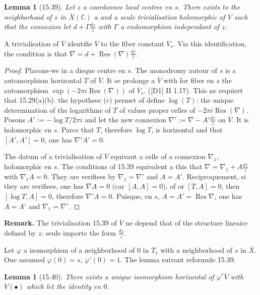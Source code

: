 \documentclass[12pt,a4paper]{article}
\theoremstyle{plain}
\newtheorem{lemma}[theorem]{Lemma}
\theoremstyle{definition}
\theoremstyle{remark}
\DeclareMathOperator{\Res}{Res}
\newcommand{\bC}{\mathbb{C}}
\begin{document}
\begin{lemma}[15.39]
Let $z$ a coordonnee local centree en $s$. There exists to the neighborhood of $s$ in $\overline{X}(\bC)$ a and a seule trivialisation holomorphic of $\overline{V}$ such that the connexion let $d + \Gamma \frac{dz}{z}$ with $\Gamma$ a endomorphism independant of $z$.
\end{lemma}

A trivialisation of $\overline{V}$ identifie $\overline{V}$ to the fiber constant $\overline{V}_s$. Via this identification, the condition is that $\nabla = d + \Res(\nabla) \frac{dz}{z}$.

\begin{proof}
Placons-we in a disque centre en $s$. The monodromy autour of $s$ is a automorphism horizontal $T$ of $\overline{V}$. It se prolonge a $\overline{V}$ with for fiber en $s$ the automorphism $\exp(-2\pi i \Res(\nabla))$ of $\overline{V}_s$. ([D1] II 1.17). This ne requiert that 15.29(a)(b). the hypothese (c) permet of define $\log(T)$: the unique determination of the logarithme of $T$ of values proper celles of $-2\pi i \Res(\nabla)$. Posons $A' := -\log T/2\pi i$ and let the new connexion $\nabla' := \nabla - A' \frac{dz}{z}$ on $\overline{V}$. It is holomorphic en $s$. Parce that $T$, therefore $\log T$, is horizontal and that $[A', A'] = 0$, one has $\nabla' A' = 0$.

The datum of a trivialisation of $\overline{V}$ equivaut a celle of a connexion $\nabla_1$, holomorphic en $s$. The conditions of 15.39 equivalent a this that $\nabla = \nabla_1 + A \frac{dz}{z}$ with $\nabla_1 A = 0$. They are verifiees by $\nabla_1 = \nabla'$ and $A = A'$. Reciproquement, si they are verifiees, one has $\nabla A = 0$ (car $[A,A] = 0$), of or $[T, A] = 0$, then $[\log T, A] = 0$, therefore $\nabla' A = 0$. Puisque, en $s$, $A = A' = \Res \nabla$, one has $A = A'$ and $\nabla_1 = \nabla'$.
\end{proof}

\textbf{Remark.} The trivialisation 15.39 of $\overline{V}$ ne depend that of the structure lineaire defined by $z$: seule importe the form $\frac{dz}{z}$.

Let $\varphi$ a isomorphism of a neighborhood of $0$ in $T_s$ with a neighborhood of $s$ in $\overline{X}$. One assumed $\varphi(0) = s$, $\varphi'(0) = 1$. The lemma suivant reformule 15.39.

\begin{lemma}[15.40]
There exists a unique isomorphism horizontal of $\varphi^* \overline{V}$ with $V(\bullet)$ which let the identity en $0$.
\end{lemma}
\end{document}
